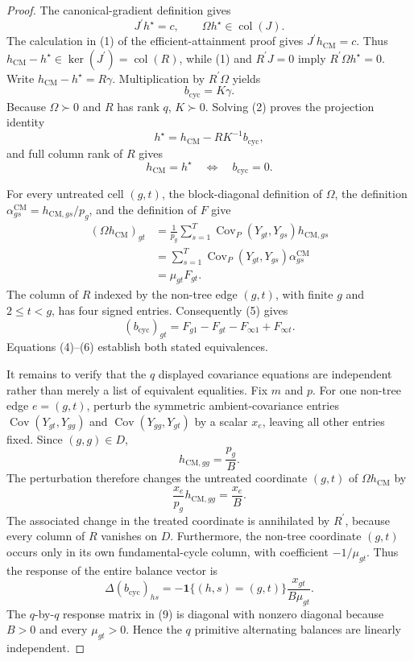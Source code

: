 \documentclass{article}
\begin{document}
\begin{proof}
The canonical-gradient definition gives
\[
J^{\prime}h^{\star}=c,
\qquad
\Omega h^{\star}\in\operatorname{col}(J).                             \tag{1}
\]
The calculation in (1) of the efficient-attainment proof gives
\(J^{\prime}h_{\mathrm{CM}}=c\).  Thus
\(h_{\mathrm{CM}}-h^{\star}\in\ker(J^{\prime})=\operatorname{col}(R)\), while (1) and \(R^{\prime}J=0\) imply
\(R^{\prime}\Omega h^{\star}=0\).  Write
\(h_{\mathrm{CM}}-h^{\star}=R\gamma\).  Multiplication by \(R^{\prime}\Omega\) yields
\[
b_{\mathrm{cyc}}=K\gamma.                                              \tag{2}
\]
Because \(\Omega\succ0\) and \(R\) has rank \(q\), \(K\succ0\).  Solving (2) proves the projection identity
\[
h^{\star}=h_{\mathrm{CM}}-RK^{-1}b_{\mathrm{cyc}},                     \tag{3}
\]
and full column rank of \(R\) gives
\[
h_{\mathrm{CM}}=h^{\star}
\quad\Longleftrightarrow\quad
b_{\mathrm{cyc}}=0.                                                     \tag{4}
\]

For every untreated cell \((g,t)\), the block-diagonal definition of \(\Omega\), the definition
\(\alpha^{\mathrm{CM}}_{gs}=h_{\mathrm{CM},gs}/p_g\), and the definition of \(F\) give
\[
\begin{aligned}
(\Omega h_{\mathrm{CM}})_{gt}
&=\frac1{p_g}\sum_{s=1}^T
 \operatorname{Cov}_P(Y_{gt},Y_{gs})h_{\mathrm{CM},gs}\\
&=\sum_{s=1}^T
 \operatorname{Cov}_P(Y_{gt},Y_{gs})\alpha^{\mathrm{CM}}_{gs}\\
&=\mu_{gt}F_{gt}.                                                       \tag{5}
\end{aligned}
\]
The column of \(R\) indexed by the non-tree edge \((g,t)\), with finite \(g\) and \(2\le t<g\), has four signed entries.  Consequently (5) gives
\[
(b_{\mathrm{cyc}})_{gt}
=F_{g1}-F_{gt}-F_{\infty1}+F_{\infty t}.                               \tag{6}
\]
Equations (4)--(6) establish both stated equivalences.

It remains to verify that the \(q\) displayed covariance equations are independent rather than merely a list of equivalent equalities.  Fix \(m\) and \(p\).  For one non-tree edge \(e=(g,t)\), perturb the symmetric ambient-covariance entries
\(\operatorname{Cov}(Y_{gt},Y_{gg})\) and
\(\operatorname{Cov}(Y_{gg},Y_{gt})\) by a scalar \(x_e\), leaving all other entries fixed.  Since \((g,g)\in D\),
\[
h_{\mathrm{CM},gg}=\frac{p_g}{B}.                                      \tag{7}
\]
The perturbation therefore changes the untreated coordinate \((g,t)\) of \(\Omega h_{\mathrm{CM}}\) by
\[
\frac{x_e}{p_g}h_{\mathrm{CM},gg}=\frac{x_e}{B}.                       \tag{8}
\]
The associated change in the treated coordinate is annihilated by \(R^{\prime}\), because every column of \(R\) vanishes on \(D\).  Furthermore, the non-tree coordinate \((g,t)\) occurs only in its own fundamental-cycle column, with coefficient \(-1/\mu_{gt}\).  Thus the response of the entire balance vector is
\[
\Delta(b_{\mathrm{cyc}})_{hs}
=-\mathbf 1\{(h,s)=(g,t)\}\frac{x_{gt}}{B\mu_{gt}}.                  \tag{9}
\]
The \(q\)-by-\(q\) response matrix in (9) is diagonal with nonzero diagonal because \(B>0\) and every \(\mu_{gt}>0\).  Hence the \(q\) primitive alternating balances are linearly independent.
\end{proof}
\end{document}
